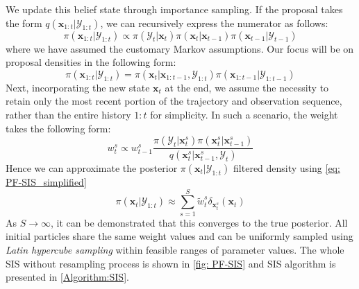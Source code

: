 We update this belief state through importance sampling. If the proposal takes the form $q(\boldsymbol{x}_{1:t}|\mathcal{Y}_{1:t})$, we can recursively express the numerator as follows:
\begin{equation}
    \label{eq: PF-recursive}
    \pi(\boldsymbol{x}_{1:t}|\mathcal{Y}_{1:t})
    \propto 
    \pi(\mathcal{Y}_{t}|\boldsymbol{x}_{t})
    \pi(\boldsymbol{x}_{t}|\boldsymbol{x}_{t-1})
    \pi(\boldsymbol{x}_{t-1}|\mathcal{Y}_{t-1})
\end{equation}
where we have assumed the customary Markov assumptions. Our focus will be on proposal densities in the following form:
\begin{equation}
    \label{eq: PF-recursive_2}
\pi(\boldsymbol{x}_{1:t}|\mathcal{Y}_{1:t})
=
\pi(\boldsymbol{x}_{t}|\boldsymbol{x}_{1:t-1},\mathcal{Y}_{1:t})
\pi(\boldsymbol{x}_{1:t-1}|\mathcal{Y}_{1:t-1})
\end{equation}
Next, incorporating the new state $\boldsymbol{x}_{t}$ at the end, we assume the necessity to retain only the most recent portion of the trajectory and observation sequence, rather than the entire history $1:t$ for simplicity. In such a scenario, the weight takes the following form:
\begin{equation}
    \label{eq: PF-modified_weight}
    w_{t}^{s}
    \propto 
    w_{t-1}^{s}
    \frac{\pi(\mathcal{Y}_{t}|\boldsymbol{x}_{t}^{s})     \pi(\boldsymbol{x}_{t}^{s}|\boldsymbol{x}_{t-1}^{s})}
    {q(\boldsymbol{x}_{t}^{s}|\boldsymbol{x}_{t-1}^{s},\mathcal{Y}_{t})} 
\end{equation}
Hence we can approximate the posterior $\pi(\boldsymbol{x}_{t}|\mathcal{Y}_{1:t})$ filtered density using \cref{eq: PF-SIS_simplified}
\begin{equation}
    \label{eq: PF-SIS_simplified}
    \pi(\boldsymbol{x}_{t}|\mathcal{Y}_{1:t})
    \approx 
    \sum_{s=1}^{S} 
    \tilde{w}_{t}^{s}
    \delta_{\boldsymbol{x}_{t}^{s}}(\boldsymbol{x}_{t})
\end{equation}
As $S \rightarrow \infty$, it can be demonstrated that this converges to the true posterior. All initial particles share the same weight values and can be uniformly sampled using \textit{Latin hypercube sampling} within feasible ranges of parameter values. The whole \acrshort{SIS} without resampling process is shown in \cref{fig: PF-SIS} and \acrshort{SIS} algorithm is presented in \ref{Algorithm:SIS}.
